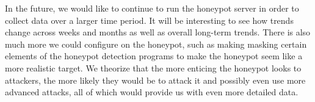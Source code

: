 In the future, we would like to continue to run the honeypot server in order to collect data over a larger time period. It will be interesting to see how trends change across weeks and months as well as overall long-term trends. There is also much more we could configure on the honeypot, such as making masking certain elements of the honeypot detection programs to make the honeypot seem like a more realistic target. We theorize that the more enticing the honeypot looks to attackers, the more likely they would be to attack it and possibly even use more advanced attacks, all of which would provide us with even more detailed data. 